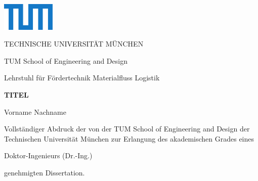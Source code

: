 
\begin{titlepage}
	\begin{singlespace}
		
		\begin{center}
			\includegraphics[height=1.34cm]{./resources/TUM_Logo_blau.pdf} \par%
			{\small{TECHNISCHE UNIVERSITÄT MÜNCHEN}\\ \par\vspace{8pt}
				TUM School of Engineering and Design \\ \par\vspace{8pt}
				Lehrstuhl für Fördertechnik Materialfluss Logistik \par
				\vspace{1.5cm}}
			
			\parbox[][2.2cm][l]{12.7cm}{\centering\large{\textbf{TITEL}}}
			
			\small{Vorname Nachname}
			
			\vspace{0.5cm}
			
			Vollständiger Abdruck der von der TUM School of Engineering and Design %
			der Technischen Universität München %
			zur Erlangung des akademischen Grades eines %
			\vspace{0.3cm}
			
			{\large 
				Doktor-Ingenieurs (Dr.-Ing.)
				\par\vspace{0.5cm}}
			
			genehmigten Dissertation.
			

\end{center}
\end{singlespace}
\end{titlepage}

